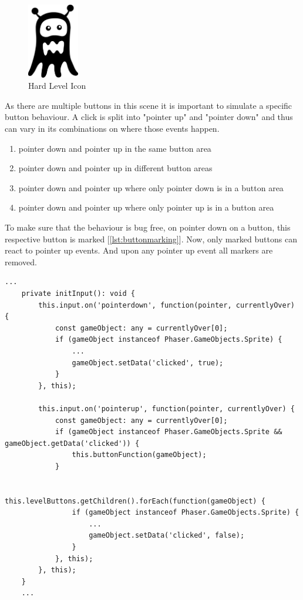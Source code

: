 \begin{figure}[H]
    \centering
    \includegraphics[width=0.2\textwidth]{figures/hardlevelicon}
    \caption{Hard Level Icon}
    \label{fig:hardlevelicon}
\end{figure}

As there are multiple buttons in this scene it is important to simulate a specific button behaviour.
A click is split into "pointer up" and "pointer down" and thus can vary in its combinations on where those events happen.

\begin{enumerate}
    \item pointer down and pointer up in the same button area
    \item pointer down and pointer up in different button areas
    \item pointer down and pointer up where only pointer down is in a button area
    \item pointer down and pointer up where only pointer up is in a button area
\end{enumerate}

To make sure that the behaviour is bug free, on pointer down on a button, this respective button is marked [\ref{lst:buttonmarking}].
Now, only marked buttons can react to pointer up events.
And upon any pointer up event all markers are removed.

\begin{lstlisting}[style=TypeScript, caption={Button marking (levelMenuScene.ts), label={lst:buttonmarking}}]
    ...
    private initInput(): void {
        this.input.on('pointerdown', function(pointer, currentlyOver) {
            const gameObject: any = currentlyOver[0];
            if (gameObject instanceof Phaser.GameObjects.Sprite) {
                ...
                gameObject.setData('clicked', true);
            }
        }, this);

        this.input.on('pointerup', function(pointer, currentlyOver) {
            const gameObject: any = currentlyOver[0];
            if (gameObject instanceof Phaser.GameObjects.Sprite && gameObject.getData('clicked')) {
                this.buttonFunction(gameObject);
            }

            this.levelButtons.getChildren().forEach(function(gameObject) {
                if (gameObject instanceof Phaser.GameObjects.Sprite) {
                    ...
                    gameObject.setData('clicked', false);
                }
            }, this);
        }, this);
    }
    ...
\end{lstlisting}

